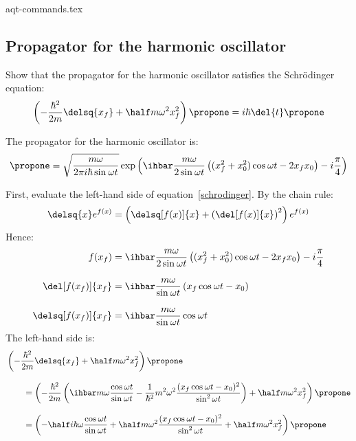 {aqt-commands.tex}
\newcommand{\w}{\omega}
\newcommand{\sinwt}[1][]{\sin^{#1}\omega t}
\newcommand{\coswt}[1][]{\cos^{#1}\omega t}
\newcommand{\cotwt}[1][]{\cot^{#1}\omega t}
\newcommand{\cscwt}[1][]{\csc^{#1}\omega t}

\subsection{Propagator for the harmonic oscillator}

Show that the propagator for the harmonic oscillator satisfies the
Schr\"{o}dinger equation:
\begin{equation}
  \label{schrodinger}
  \left(-\frac{\hbar^2}{2m}\delsq{x_f} + \half m\w ^2 x_f^2\right) \propone
  =
  i\hbar\del{t}\propone
\end{equation}

The propagator for the harmonic oscillator is:
\begin{equation}
  \label{propagator}
  \propone
  =
  \sqrt{\frac{m\w }{2\pi i\hbar\sinwt}}
  \exp\left(
  \ihbar\frac{m\w }{2\sinwt}\left(
  (x_f^2 + x_0^2)\coswt - 2x_f x_0
  \right) - i\frac{\pi}{4}
  \right)
\end{equation}

First, evaluate the left-hand side of equation~\ref{schrodinger}.
By the chain rule:
\begin{equation*}
  \delsq{x} e^{f(x)}
  =
  \left(\delsq[f(x)]{x} + \left(\del[f(x)]{x}\right)^2\right) e^{f(x)}
\end{equation*}
Hence:
\begin{align*}
  f(x_f)
   & =
  \ihbar\frac{m\w }{2\sinwt}\left(
  (x_f^2 + x_0^2)\coswt - 2x_f x_0
  \right) - i\frac{\pi}{4}
  \\[2ex]
  \del[f(x_f)]{x_f}
   & =
  \ihbar\frac{m\w }{\sinwt}\left(
  x_f\coswt - x_0
  \right)
  \\[2ex]
  \delsq[f(x_f)]{x_f}
   & =
  \ihbar\frac{m\w }{\sinwt}\coswt
\end{align*}
The left-hand side is:
\begin{align}
   & \left(-\frac{\hbar^2}{2m}\delsq{x_f} +
  \half m\w ^2 x_f^2\right) \propone
  \nonumber
  \\[2ex]
   & \qquad =
  \left(
  -\frac{\hbar^2}{2m}\left(
    \ihbar m\w\frac{\coswt}{\sinwt} -
    \frac{1}{\hbar^2}m^2\w ^2 \frac{(x_f \coswt - x_0)^2}{\sinwt[2]}
    \right) +
  \half m\w ^2 x_f^2
  \right)
  \propone
  \nonumber
  \\[2ex]
  \label{lhs}
   & \qquad =
  \left(
  -\half i\hbar\w\frac{\coswt}{\sinwt} +
  \half m\w^2\frac{(x_f \coswt - x_0)^2}{\sinwt[2]} +
  \half m\w ^2 x_f^2
  \right)
  \propone
\end{align}

